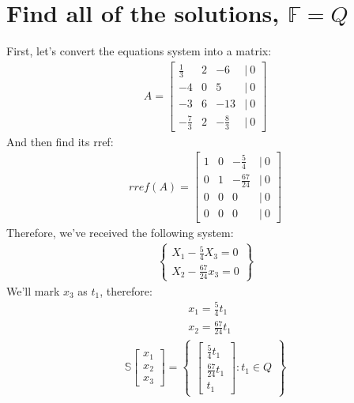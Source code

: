 \documentclass[a4paper, 12pt]{article}
\newcommand{\?}{\stackrel{?}{=}}
\newcommand{\F}{\ensuremath{\mathbb{F}}}
\newcommand{\eq}[1]{\begin{align*}#1\end{align*}}
\begin{document}
\setcounter{section}{7}
\section{Find all of the solutions, $\F=Q$}
First, let's convert the equations system into a matrix:
\eq{A=\begin{bmatrix}
    \frac{1}{3}&2&-6&|~0\\
    -4&0&5&|~0\\
    -3&6&-13&|~0\\
    -\frac{7}{3}&2&-\frac{8}{3}&|~0
\end{bmatrix}}
And then find its rref:
\eq{rref(A)=\begin{bmatrix}
    1&0&-\frac{5}{4}&|~0\\
    0&1&-\frac{67}{24}&|~0\\
    0&0&0&|~0\\
    0&0&0&|~0
\end{bmatrix}}
Therefore, we've received the following system:
\eq{\begin{Bmatrix}
    X_1-\frac{5}{4}X_3=0\\
    X_2-\frac{67}{24}x_3=0
\end{Bmatrix}}
We'll mark $x_3$ as $t_1$, therefore:
\eq{&x_1=\frac{5}{4}t_1\\&x_2=\frac{67}{24}t_1}
\eq{
    \mathbb{S}
    \begin{bmatrix}x_1\\x_2\\x_3\end{bmatrix}
    =
    \begin{Bmatrix}
        \begin{bmatrix}\frac{5}{4}t_1\\\frac{67}{24}t_1\\t_1\end{bmatrix}
    :
    t_1\in{Q}
    \end{Bmatrix}
}

\end{document}
